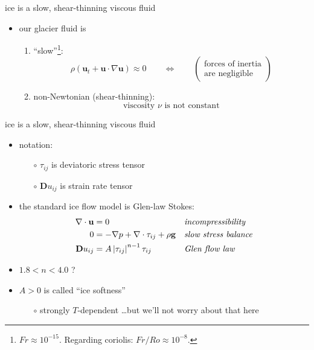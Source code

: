 \documentclass{beamer}
\begin{document}
\begin{frame}{ice is a slow, shear-thinning viscous fluid}

\begin{itemize}
\item our glacier fluid is
  \begin{enumerate}
  \item ``slow''\footnote{$Fr\approx 10^{-15}$.  Regarding coriolis: $Fr/Ro \approx 10^{-8}$.}:
    $$\rho \left(\mathbf{u}_t + \mathbf{u}\cdot\nabla \mathbf{u}\right) \approx 0 \qquad \iff \qquad \begin{pmatrix} \text{forces of inertia} \\ \text{are negligible} \end{pmatrix}$$
  \item non-Newtonian (shear-thinning):
    $$\text{viscosity $\nu$ is not constant}$$
  \end{enumerate}
\end{itemize}
\end{frame}


\begin{frame}{ice is a slow, shear-thinning viscous fluid}

\begin{itemize}
\item notation:
  \begin{itemize}
  \item[$\circ$] $\tau_{ij}$ is deviatoric stress tensor
  \item[$\circ$] $\mathbf{D}u_{ij}$ is strain rate tensor
  \end{itemize}
\smallskip
\item the standard ice flow model is Glen-law Stokes:
\begin{align*}
\nabla \cdot \mathbf{u} &= 0 &&\text{\emph{incompressibility}} \\
0 &= - \nabla p + \nabla \cdot \tau_{ij} + \rho \mathbf{g} &&\text{\emph{slow stress balance}} \\
\mathbf{D}u_{ij} &= A \left|\tau_{ij}\right|^{n-1} \tau_{ij} &&\text{\emph{Glen flow law}}
\end{align*}
\item $1.8 < n < 4.0$ ?  \quad {}
\medskip
\item $A>0$ is called ``ice softness''
  \begin{itemize}
  \item[$\circ$] strongly $T$-dependent \dots but we'll not worry about that here
  \end{itemize}
\end{itemize}
\end{frame}
\end{document}
